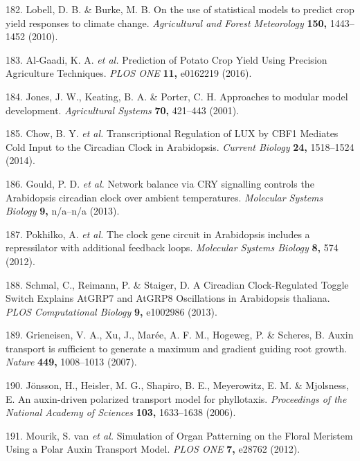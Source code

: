 \documentclass[12pt,]{book}
\begin{document}
\hypertarget{ref-lobell_use_2010}{}
182. Lobell, D. B. \& Burke, M. B. On the use of statistical models to
predict crop yield responses to climate change. \emph{Agricultural and
Forest Meteorology} \textbf{150,} 1443--1452 (2010).

\hypertarget{ref-al_gaadi_prediction_2016}{}
183. Al-Gaadi, K. A. \emph{et al.} Prediction of Potato Crop Yield Using
Precision Agriculture Techniques. \emph{PLOS ONE} \textbf{11,} e0162219
(2016).

\hypertarget{ref-jones_approaches_2001}{}
184. Jones, J. W., Keating, B. A. \& Porter, C. H. Approaches to modular
model development. \emph{Agricultural Systems} \textbf{70,} 421--443
(2001).

\hypertarget{ref-chow_transcriptional_2014}{}
185. Chow, B. Y. \emph{et al.} Transcriptional Regulation of LUX by CBF1
Mediates Cold Input to the Circadian Clock in Arabidopsis. \emph{Current
Biology} \textbf{24,} 1518--1524 (2014).

\hypertarget{ref-gould_network_2013}{}
186. Gould, P. D. \emph{et al.} Network balance via CRY signalling
controls the Arabidopsis circadian clock over ambient temperatures.
\emph{Molecular Systems Biology} \textbf{9,} n/a--n/a (2013).

\hypertarget{ref-pokhilko_clock_2012}{}
187. Pokhilko, A. \emph{et al.} The clock gene circuit in Arabidopsis
includes a repressilator with additional feedback loops. \emph{Molecular
Systems Biology} \textbf{8,} 574 (2012).

\hypertarget{ref-schmal_circadian_2013}{}
188. Schmal, C., Reimann, P. \& Staiger, D. A Circadian Clock-Regulated
Toggle Switch Explains AtGRP7 and AtGRP8 Oscillations in Arabidopsis
thaliana. \emph{PLOS Computational Biology} \textbf{9,} e1002986 (2013).

\hypertarget{ref-grieneisen_auxin_2007}{}
189. Grieneisen, V. A., Xu, J., Marée, A. F. M., Hogeweg, P. \& Scheres,
B. Auxin transport is sufficient to generate a maximum and gradient
guiding root growth. \emph{Nature} \textbf{449,} 1008--1013 (2007).

\hypertarget{ref-jonsson_auxin_driven_2006}{}
190. Jönsson, H., Heisler, M. G., Shapiro, B. E., Meyerowitz, E. M. \&
Mjolsness, E. An auxin-driven polarized transport model for phyllotaxis.
\emph{Proceedings of the National Academy of Sciences} \textbf{103,}
1633--1638 (2006).

\hypertarget{ref-mourik_simulation_2012}{}
191. Mourik, S. van \emph{et al.} Simulation of Organ Patterning on the
Floral Meristem Using a Polar Auxin Transport Model. \emph{PLOS ONE}
\textbf{7,} e28762 (2012).
\end{document}

